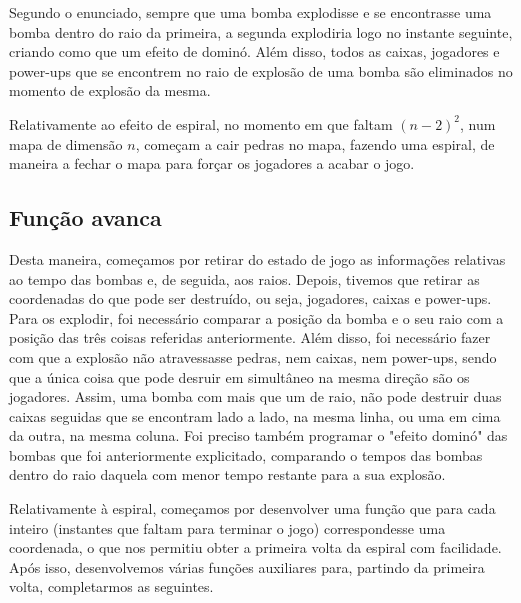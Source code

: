 \documentclass[a4paper]{article}
\begin{document}
Segundo o enunciado, sempre que uma bomba explodisse e se encontrasse uma bomba dentro do raio da primeira, a segunda explodiria logo no instante seguinte, criando como que um efeito de dominó. Além disso, todos as caixas, jogadores e power-ups que se encontrem no raio de explosão de uma bomba são eliminados no momento de explosão da mesma.

Relativamente ao efeito de espiral, no momento em que faltam \((n-2)^2\), num mapa de dimensão \(n\), começam a cair pedras no mapa, fazendo uma espiral, de maneira a fechar o mapa para forçar os jogadores a acabar o jogo.

\subsection{Função avanca}
Desta maneira, começamos por retirar do estado de jogo as informações relativas ao tempo das bombas e, de seguida, aos raios. Depois, tivemos que retirar as coordenadas do que pode ser destruído, ou seja, jogadores, caixas e power-ups. Para os explodir, foi necessário comparar a posição da bomba e o seu raio com a posição das três coisas referidas anteriormente. Além disso, foi necessário fazer com que a explosão não atravessasse pedras, nem caixas, nem power-ups, sendo que a única coisa que pode desruir em simultâneo na mesma direção são os jogadores. Assim, uma bomba com mais que um de raio, não pode destruir duas caixas seguidas que se encontram lado a lado, na mesma linha, ou uma em cima da outra, na mesma coluna. Foi preciso também programar o "efeito dominó" das bombas que foi anteriormente explicitado, comparando o tempos das bombas dentro do raio daquela com menor tempo restante para a sua explosão.

Relativamente à espiral, começamos por desenvolver uma função que para cada inteiro (instantes que faltam para terminar o jogo) correspondesse uma coordenada, o que nos permitiu obter a primeira volta da espiral com facilidade. Após isso, desenvolvemos várias funções auxiliares para, partindo da primeira volta, completarmos as seguintes.
\end{document}
